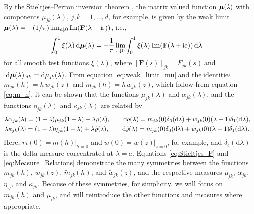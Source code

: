 \documentclass{cmslatex}
\newcommand{\I}{\mathrm{i}}
\renewcommand{\d}{\text{d}}
\newcommand\bmu{\mbox{\boldmath${\mu}$}}
\begin{document}
By the Stieltjes--Perron inversion theorem
\cite{Henrici:1974:v2,MILTON:2002:TC}, the matrix valued function
$\bmu(\lambda)$ with components $\mu_{jk}(\lambda)$, $j,k=1,\ldots,d$, for example, is
given by the weak limit  
$\bmu(\lambda)=-(1/\pi)\lim_{\varepsilon\downarrow0}\text{Im}(\mathbf{F}(\lambda+\I\varepsilon))$, i.e., 
%
\begin{align}\label{eq:weak_limit_mu}
  \int_0^1\xi(\lambda)\;\d\bmu(\lambda)
  =-\frac{1}{\pi}\lim_{\varepsilon\downarrow0}
        \int_0^1\xi(\lambda)\;\text{Im}(\mathbf{F}(\lambda+\I\varepsilon))\, \d\lambda,
\end{align}
%
for all smooth test functions $\xi(\lambda)$, where
$[\mathbf{F}(s)]_{jk}=F_{jk}(s)$ and
$[\d\bmu(\lambda)]_{jk}=\d\mu_{jk}(\lambda)$. From equation 
\eqref{eq:weak_limit_mu} and the identities 
$m_{jk}(h)=h\,w_{jk}(z)$ and $\tilde{m}_{jk}(h)=h\,\tilde{w}_{jk}(z)$,
which follow from equation \eqref{eq:m_h}, it can be
shown \cite{Murphy:JMP:063506} that the functions $\mu_{jk}(\lambda)$ and
$\alpha_{jk}(\lambda)$, and the functions $\eta_{jk}(\lambda)$ and $\kappa_{jk}(\lambda)$ are
related by
%
\begin{align}\label{eq:Measure_Relations}
  &\lambda\alpha_{jk}(\lambda)=(1-\lambda)\mu_{jk}(1-\lambda)+\lambda\varrho(\lambda), \qquad
  \d\varrho(\lambda)=m_{jk}(0)\delta_0(\d\lambda)+w_{jk}(0)(\lambda-1)\delta_1(\d\lambda),
  \notag     \\
  &\lambda\kappa_{jk}(\lambda)=(1-\lambda)\eta_{jk}(1-\lambda)+\lambda\tilde{\varrho}(\lambda), \qquad
  \d\tilde{\varrho}(\lambda)=\tilde{m}_{jk}(0)\delta_0(\d\lambda)+\tilde{w}_{jk}(0)(\lambda-1)\delta_1(\d\lambda).  
\end{align}
%
Here, $m(0)=m(h)|_{h=0}$ and $w(0)=w(z)|_{z=0}$, for example, and
$\delta_a(\d\lambda)$ is the delta measure concentrated at $\lambda=a$. Equations
\eqref{eq:Stieltjes_F} and \eqref{eq:Measure_Relations} demonstrate
the many symmetries between 
the functions $m_{jk}(h)$, $w_{jk}(z)$, $\tilde{m}_{jk}(h)$, and
$\tilde{w}_{jk}(z)$, and the respective measures $\mu_{jk}$, $\alpha_{jk}$,
$\eta_{ij}$, and $\kappa_{jk}$. Because of these symmetries, for simplicity,
we will focus on $m_{jk}(h)$ and $\mu_{jk}$, and will reintroduce the
other functions and measures where appropriate.  
\end{document}
